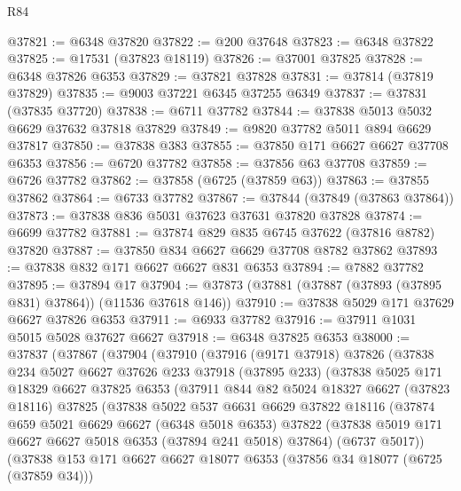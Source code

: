 \begin{lexlean}{R84}
\begin{coremodule}
@37821 := @6348 @37820
@37822 := @200 @37648
@37823 := @6348 @37822
@37825 := @17531 (@37823 @18119)
@37826 := @37001 @37825
@37828 := @6348 @37826 @6353
@37829 := @37821 @37828
@37831 := @37814 (@37819 @37829)
@37835 := @9003 @37221 @6345 @37255 @6349
@37837 := @37831 (@37835 @37720)
@37838 := @6711 @37782
@37844 := @37838 @5013 @5032 @6629 @37632 @37818 @37829
@37849 := @9820 @37782 @5011 @894 @6629 @37817
@37850 := @37838 @383
@37855 := @37850 @171 @6627 @6627 @37708 @6353
@37856 := @6720 @37782
@37858 := @37856 @63 @37708
@37859 := @6726 @37782
@37862 := @37858 (@6725 (@37859 @63))
@37863 := @37855 @37862
@37864 := @6733 @37782
@37867 := @37844 (@37849 (@37863 @37864))
@37873 := @37838 @836 @5031 @37623 @37631 @37820 @37828
@37874 := @6699 @37782
@37881 := @37874 @829 @835 @6745 @37622 (@37816 @8782) @37820
@37887 := @37850 @834 @6627 @6629 @37708 @8782 @37862
@37893 := @37838 @832 @171 @6627 @6627 @831 @6353
@37894 := @7882 @37782
@37895 := @37894 @17
@37904 := @37873 (@37881 (@37887 (@37893 (@37895 @831) @37864)) (@11536 @37618 @146))
@37910 := @37838 @5029 @171 @37629 @6627 @37826 @6353
@37911 := @6933 @37782
@37916 := @37911 @1031 @5015 @5028 @37627 @6627
@37918 := @6348 @37825 @6353
@38000 := @37837
    (@37867
      (@37904
        (@37910
          (@37916
            (@9171 @37918)
            @37826
            (@37838
              @234
              @5027
              @6627
              @37626
              @233
              @37918
              (@37895 @233)
              (@37838
                @5025
                @171
                @18329
                @6627
                @37825
                @6353
                (@37911
                  @844
                  @82
                  @5024
                  @18327
                  @6627
                  (@37823 @18116)
                  @37825
                  (@37838
                    @5022
                    @537
                    @6631
                    @6629
                    @37822
                    @18116
                    (@37874
                      @659
                      @5021
                      @6629
                      @6627
                      (@6348 @5018 @6353)
                      @37822
                      (@37838 @5019 @171 @6627 @6627 @5018 @6353 (@37894 @241 @5018) @37864)
                      (@6737 @5017))
                    (@37838
                      @153
                      @171
                      @6627
                      @6627
                      @18077
                      @6353
                      (@37856 @34 @18077 (@6725 (@37859 @34)))

\end{coremodule}
\end{lexlean}

